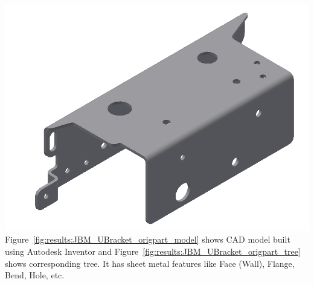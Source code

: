 
\begin{minipage}{\linewidth}
\begin{minipage}[c]{0.62\linewidth}
\includegraphics[width=\linewidth,valign=t]{../Common/images/JBM_UBracket_origpart_model}
 \label{fig:results:JBM_UBracket_origpart_model}
Figure~\ref{fig:results:JBM_UBracket_origpart_model} shows CAD model built using Autodesk Inventor and Figure~\ref{fig:results:JBM_UBracket_origpart_tree} shows corresponding tree. It has sheet metal features like Face (Wall), Flange, Bend, Hole, etc.
\end{minipage}
\quad
\begin{minipage}[c]{0.3\linewidth}

\end{minipage}
\end{minipage}
